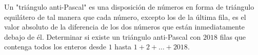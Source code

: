 Un "triángulo anti-Pascal" es una disposición de números en forma de triángulo equilátero de tal manera que cada número, excepto los de la última fila, es el valor absoluto de la diferencia de los dos números que están inmediatamente debajo de él. Determinar si existe un triángulo anti-Pascal con $2018$ filas que contenga todos los enteros desde $1$ hasta $1+2+\dots+2018$.
